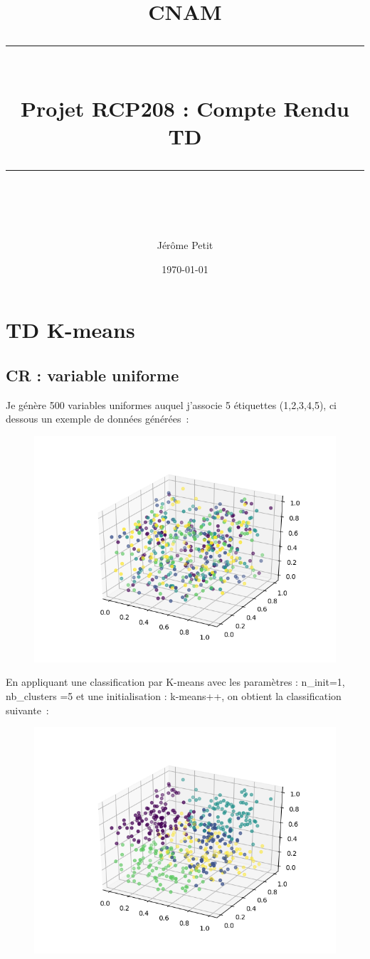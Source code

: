 \documentclass[12pt]{scrartcl} %
\title{	
	\normalfont\normalsize
	\textsc{CNAM}\\ %
	\vspace{25pt} %
	\rule{\linewidth}{0.5pt}\\ %
	\vspace{20pt} %
	{\huge Projet RCP208 : Compte Rendu TD}\\ %
	\vspace{12pt} %
	\rule{\linewidth}{2pt}\\ %
	\vspace{12pt} %
}
\author{\LARGE Jérôme Petit} %
\date{\normalsize\today} %
\begin{document}
\maketitle %


\section{TD K-means}
\subsection{CR : variable uniforme}
Je génère 500 variables uniformes auquel j'associe 5 étiquettes (1,2,3,4,5), ci dessous un exemple de données générées~:
\newline
\begin{figure}[!h]
 \centering 
\includegraphics[scale=.3]{uniform.png}
\end{figure}
\newline
En appliquant une classification par K-means avec les paramètres : n\_init=1, nb\_clusters =5 et une initialisation : k-means++, on obtient la classification suivante~: 
\newline
\begin{figure}[!h]
 \centering 
\includegraphics[scale=.3]{uniformKmeans.png}
\end{figure}
\end{document}
